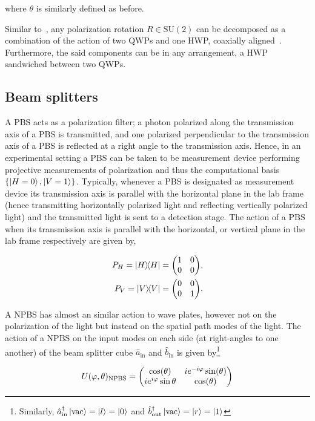 \noindent
where $\theta$ is similarly defined as before.


\bigskip
\noindent
Similar to~, any polarization rotation $R \in \text{SU}(2)$ can be decomposed as a combination of the action of two \acs{QWP}s and one \acs{HWP}, coaxially aligned~\cite{Simon_1990}. Furthermore, the said components can be in any arrangement, \ie a \acs{HWP} sandwiched between two \acs{QWP}s.


\subsection{Beam splitters}

A \gls{PBS} acts as a polarization filter; a photon polarized along the transmission axis of a \acs{PBS} is transmitted, and one polarized perpendicular to the transmission axis of a \acs{PBS} is reflected at a right angle to the transmission axis. Hence, in an experimental setting a \acs{PBS} can be taken to be measurement device performing projective measurements of polarization and thus the computational basis $\{\ket{H=0}, \ket{V=1}\}$. Typically, whenever a \acs{PBS} is designated as measurement device its transmission axis is parallel with the horizontal plane in the lab frame (hence transmitting horizontally polarized light and reflecting vertically polarized light) and the transmitted light is sent to a detection stage. The action of a \acs{PBS} when its transmission axis is parallel with the horizontal, or vertical plane in the lab frame respectively are given by,

\begin{align}
	P_H = \op{H} = \mqty(1 & 0 \\ 0 & 0), \\
	P_V = \op{V} = \mqty(0 & 0 \\ 0 & 1).
\end{align}

\noindent
A \gls{NPBS} has almost an similar action to wave plates, however not on the polarization of the light but instead on the spatial path modes of the light. The action of a \acs{NPBS} on the input modes on each side (at right-angles to one another) of the beam splitter cube $\hat{a}_\text{in}$ and $\hat{b}_\text{in}$ is given by\footnote{Similarly, $\hat{a}^{\dagger}_\text{in}\ket{\text{vac}} = \ket{l} = \ket{0}$ and $\hat{b}^{\dagger}_\text{out}\ket{\text{vac}}=\ket{r}=\ket{1}$} 

\begin{align}
	U(\varphi, \theta)_\text{NPBS} = \mqty(\cos(\theta) & ie^{-i\varphi}\sin(\theta) \\ ie^{i\varphi}\sin{\theta} & \cos(\theta))
\end{align}

